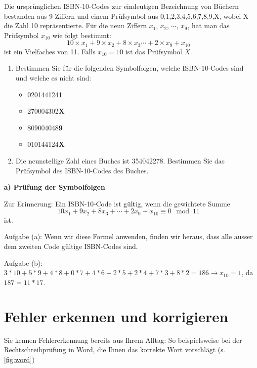 \begin{myexercise}
    Die ursprünglichen ISBN-10-Codes zur eindeutigen Bezeichnung von Büchern bestanden aus 9 Ziffern und einem Prüfsymbol aus {0,1,2,3,4,5,6,7,8,9,X}, wobei X die Zahl 10 repräsentierte. Für die neun Ziffern $x_1$, $x_2$, $\cdots$, $x_9$, hat man das Prüfsymbol $x_{10}$ wie folgt bestimmt:
    \[10\times x_1+9\times x_2+8\times x_3\cdots+2\times x_9 + x_{10}\]
    ist ein Vielfaches von 11. Falls $x_{10} = 10$ ist das Prüfsymbol $X$.
    \begin{enumerate}
        \item Bestimmen Sie für die folgenden Symbolfolgen, welche ISBN-10-Codes sind und welche es nicht sind:
              \begin{itemize}
                  \item 020144124\textbf{1}
                  \item 270004302\textbf{X}
                  \item 809004048\textbf{9}
                  \item 010144124\textbf{X}
              \end{itemize}
        \item Die neunstellige Zahl eines Buches ist 354042278. Bestimmen Sie das Prüfsymbol des ISBN-10-Codes des Buches.
    \end{enumerate}
    \begin{myanswer}
        \textbf{a) Prüfung der Symbolfolgen}

        Zur Erinnerung: Ein ISBN-10-Code ist gültig, wenn die gewichtete Summe
        \[
            10x_1 + 9x_2 + 8x_3 + \cdots + 2x_9 + x_{10} \equiv 0 \mod 11
        \]
        ist.

        Aufgabe (a): Wenn wir diese Formel anwenden, finden wir heraus, dass alle ausser dem zweiten Code gültige ISBN-Codes sind.

        Aufgabe (b): $3*10+5*9+4*8+0*7+4*6+2*5+2*4+7*3+8*2=186 \rightarrow x_{10}=1$, da $187=11*17$.

    \end{myanswer}

\end{myexercise}

\section{Fehler erkennen und korrigieren}

Sie kennen Fehlererkennung bereits aus Ihrem Alltag: So beispielsweise bei der Rechtschreibprüfung in Word, die Ihnen das korrekte Wort vorschlägt (s. \cref{fig:word})

